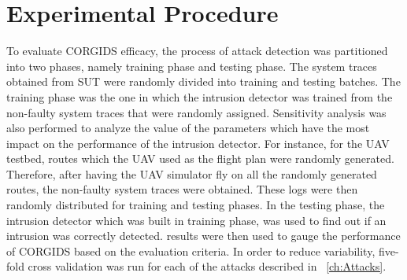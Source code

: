 \section{Experimental Procedure}
To evaluate \ac{CORGIDS} efficacy, the process of attack detection was partitioned  into two phases, namely training phase and testing phase. The system traces obtained from \ac{SUT} were randomly divided into training and testing batches. The training phase was the one in which the intrusion detector was trained from the non-faulty system traces that were randomly assigned. Sensitivity analysis was also performed to analyze the value of the parameters which have the most impact on the performance of the intrusion detector. For instance, for the \ac{UAV} testbed, routes which the \ac{UAV} used as the flight plan were randomly generated. Therefore, after having the \ac{UAV} simulator fly on all the randomly generated routes, the non-faulty system traces were obtained. These logs were then randomly distributed for training and testing phases. In the testing phase, the intrusion detector which was built in training phase, was used to find out if an intrusion was correctly detected.  results were then used to gauge the performance of \ac{CORGIDS} based on the evaluation criteria. In order to reduce variability, five-fold cross validation was run for each of the attacks described in ~\autoref{ch:Attacks}.

\endinput
=====================================================================
